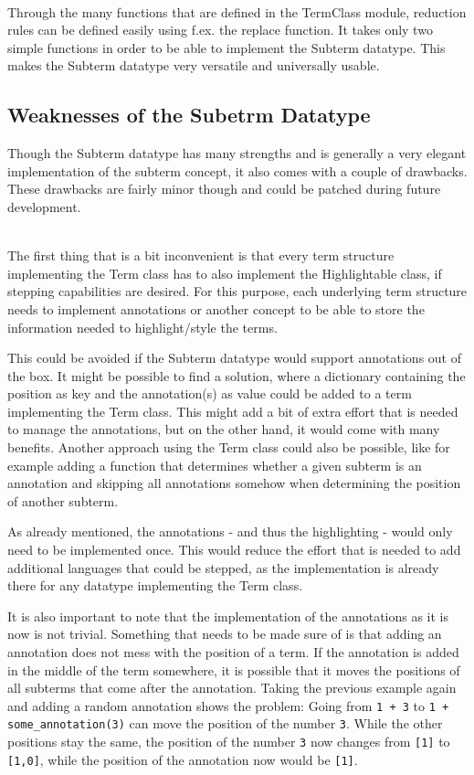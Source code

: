 \ \\
Through the many functions that are defined in the TermClass module,
reduction rules can be defined easily using f.ex. the replace function.
It takes only two simple functions in order to be able to implement the Subterm datatype.
This makes the Subterm datatype very versatile and universally usable.

\subsection{Weaknesses of the Subetrm Datatype}
Though the Subterm datatype has many strengths and is generally a very elegant implementation of the subterm concept,
it also comes with a couple of drawbacks.
These drawbacks are fairly minor though and could be patched during future development.

\ \\
The first thing that is a bit inconvenient is that every term structure implementing the Term class has to also implement the Highlightable class,
if stepping capabilities are desired.
For this purpose,
each underlying term structure needs to implement annotations or another concept to be able to store the information needed to highlight/style the terms.

This could be avoided if the Subterm datatype would support annotations out of the box.
It might be possible to find a solution,
where a dictionary containing the position as key and the annotation(s) as value could be added to a term implementing the Term class.
This might add a bit of extra effort that is needed to manage the annotations,
but on the other hand, it would come with many benefits.
Another approach using the Term class could also be possible,
like for example adding a function that determines whether a given subterm is an annotation and skipping all annotations somehow when determining the position of another subterm.

As already mentioned, the annotations - and thus the highlighting - would only need to be implemented once.
This would reduce the effort that is needed to add additional languages that could be stepped,
as the implementation is already there for any datatype implementing the Term class.

It is also important to note that the implementation of the annotations as it is now is not trivial.
Something that needs to be made sure of is that adding an annotation does not mess with the position of a term.
If the annotation is added in the middle of the term somewhere,
it is possible that it moves the positions of all subterms that come after the annotation.
Taking the previous example again and adding a random annotation shows the problem:
Going from \texttt{1 + 3} to \texttt{1 + some\_annotation(3)} can move the position of the number \texttt{3}.
While the other positions stay the same, the position of the number \texttt{3} now changes from \texttt{[1]} to \texttt{[1,0]},
while the position of the annotation now would be \texttt{[1]}.

